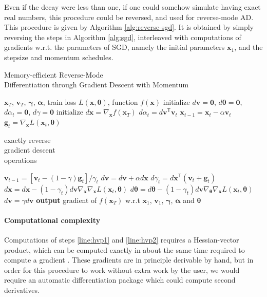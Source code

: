 \documentclass{article}
\newcommand{\vx}{\mathbf{x}}
\newcommand{\vv}{\mathbf{v}}
\newcommand{\vg}{\mathbf{g}}
\newcommand{\vzero}{\mathbf{0}}
\newcommand{\tra}{^{\mathsf{T}}}
\newcommand{\hypers}{{\boldsymbol{\theta}}}
\newcommand{\params}{\vx}
\newcommand{\decay}{\gamma}
\newcommand{\decays}{{\boldsymbol{\decay}}}
\newcommand{\stepsize}{\alpha}
\newcommand{\stepsizes}{{\boldsymbol{\stepsize}}}
\newcommand{\gradparamst}{\nabla_\params L(\params_t, \hypers)}
\begin{document}
Even if the decay were less than one, if one could somehow simulate having exact real numbers, this procedure could be reversed, and used for reverse-mode AD.
This procedure is given by Algorithm \ref{alg:reverse-sgd}.
It is obtained by simply reversing the steps in Algorithm \ref{alg:sgd}, interleaved with computations of gradients w.r.t. the parameters of SGD, namely the initial parameters $\vx_1$, and the stepsize and momentum schedules.
%
\begin{algorithm}[t]
   \caption{Memory-efficient Reverse-Mode \\ Differentiation through Gradient Descent with Momentum}
   \label{alg:reverse-sgd}
\begin{algorithmic}[1]
    $\vx_T$, $\vv_T$, $\decays$, $\stepsizes$, train loss $L(\params, \hypers)$, function $f(\params)$
   \State initialize $d\vv = \vzero$, $d\hypers = \vzero$, $d\stepsize_t = \vzero$, $d\decay = \vzero$
   \State initialize $d\vx = \nabla_\params f(\params_T)$
   \State $d\stepsize_t = d\vv\tra \vv_t$
   \State $\vx_{t-1} = \vx_t - \stepsize \vv_t$
   \vspace{-0.95\baselineskip}
   \State $\vg_t = \gradparamst$
   \hfill \scalebox{1.1}{\Bigg\}} \vspace{-\baselineskip} \begin{minipage}{2.5cm} exactly reverse \\ gradient descent \\ operations \strut \end{minipage}
   \State $\vv_{t-1} = [\vv_t - (1 - \decay) \vg_t] / \decay_t$
   \State $d\vv = d\vv + \stepsize d\vx$
   \State $d\decay_t = d\vx\tra (\vv_t + \vg_t)$
   \State $d\vx = d\vx - (1 - \decay_t) d\vv \nabla_\params \gradparamst$ \label{line:hvp1}
   \State $d\hypers = d\hypers - (1 - \decay_t) d\vv \nabla_\hypers \gradparamst$ \label{line:hvp2}
   \State $d\vv = \decay d\vv$
   \EndFor
   \State \textbf{output} gradient of $f(\vx_T)$ w.r.t $\vx_1$, $\vv_1$, $\decays$, $\stepsizes$ and $\hypers$
\end{algorithmic}
\end{algorithm}
%

\paragraph{Computational complexity}
Computations of steps \ref{line:hvp1} and \ref{line:hvp2} requires a Hessian-vector product, which can be computed exactly in about the same time required to compute a gradient \citep{pearlmutter1994fast}.
These gradients are in principle derivable by hand, but in order for this procedure to work without extra work by the user, we would require an automatic differentiation package which could compute second derivatives.
\end{document}
